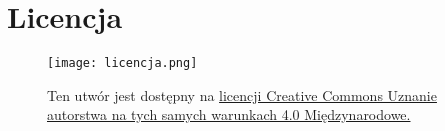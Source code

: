 \section*{Licencja}
    \begin{figure}[h]
    	\begin{minipage}[c]{0.25\textwidth}
    		\texttt{[image: licencja.png]}
    	\end{minipage}\hfill
    	\begin{minipage}[c]{0.75\textwidth}
    		\caption*{
    			Ten utwór jest dostępny na 
    			\href{https://creativecommons.org/licenses/by-sa/4.0/}{licencji Creative Commons Uznanie autorstwa
    			na tych samych warunkach 4.0 Międzynarodowe.}
    		}
    	\end{minipage}
    \end{figure}
